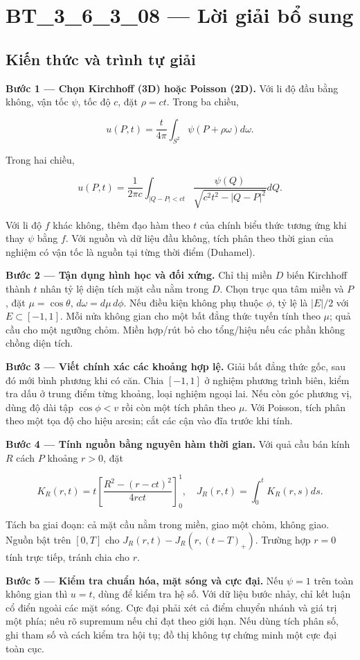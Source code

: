 \documentclass[10pt,a4paper]{article}
\begin{document}
\section*{BT\_3\_6\_3\_08 — Lời giải bổ sung}
\subsection*{Kiến thức và trình tự giải}
\textbf{Bước 1 — Chọn Kirchhoff (3D) hoặc Poisson (2D).} Với li độ đầu bằng không, vận tốc $\psi$, tốc độ $c$, đặt $\rho=ct$. Trong ba chiều,


\[
u(P,t)=\frac t{4\pi}\int_{S^2}\psi(P+\rho\omega)d\omega.
\]


Trong hai chiều,


\[
u(P,t)=\frac1{2\pi c}\int_{|Q-P|<ct}\frac{\psi(Q)}{\sqrt{c^2t^2-|Q-P|^2}}dQ.
\]


Với li độ $f$ khác không, thêm đạo hàm theo $t$ của chính biểu thức tương ứng khi thay $\psi$ bằng $f$. Với nguồn và dữ liệu đầu không, tích phân theo thời gian của nghiệm có vận tốc là nguồn tại từng thời điểm (Duhamel).

\textbf{Bước 2 — Tận dụng hình học và đối xứng.} Chỉ thị miền $D$ biến Kirchhoff thành $t$ nhân tỷ lệ diện tích mặt cầu nằm trong $D$. Chọn trục qua tâm miền và $P$, đặt $\mu=\cos\theta$, $d\omega=d\mu\,d\phi$. Nếu điều kiện không phụ thuộc $\phi$, tỷ lệ là $|E|/2$ với $E\subset[-1,1]$. Mỗi nửa không gian cho một bất đẳng thức tuyến tính theo $\mu$; quả cầu cho một ngưỡng chỏm. Miền hợp/rút bỏ cho tổng/hiệu nếu các phần không chồng diện tích.

\textbf{Bước 3 — Viết chính xác các khoảng hợp lệ.} Giải bất đẳng thức gốc, sau đó mới bình phương khi có căn. Chia $[-1,1]$ ở nghiệm phương trình biên, kiểm tra dấu ở trung điểm từng khoảng, loại nghiệm ngoại lai. Nếu còn góc phương vị, dùng độ dài tập $\cos\phi<v$ rồi còn một tích phân theo $\mu$. Với Poisson, tích phân theo một tọa độ cho hiệu arcsin; cắt các cận vào đĩa trước khi tính.

\textbf{Bước 4 — Tính nguồn bằng nguyên hàm thời gian.} Với quả cầu bán kính $R$ cách $P$ khoảng $r>0$, đặt


\[
K_R(r,t)=t\left[\frac{R^2-(r-ct)^2}{4rct}\right]_0^1,\quad J_R(r,t)=\int_0^tK_R(r,s)ds.
\]


Tách ba giai đoạn: cả mặt cầu nằm trong miền, giao một chỏm, không giao. Nguồn bật trên $[0,T]$ cho $J_R(r,t)-J_R(r,(t-T)_+)$. Trường hợp $r=0$ tính trực tiếp, tránh chia cho $r$.

\textbf{Bước 5 — Kiểm tra chuẩn hóa, mặt sóng và cực đại.} Nếu $\psi=1$ trên toàn không gian thì $u=t$, dùng để kiểm tra hệ số. Với dữ liệu bước nhảy, chỉ kết luận cổ điển ngoài các mặt sóng. Cực đại phải xét cả điểm chuyển nhánh và giá trị một phía; nêu rõ supremum nếu chỉ đạt theo giới hạn. Nếu dùng tích phân số, ghi tham số và cách kiểm tra hội tụ; đồ thị không tự chứng minh một cực đại toàn cục.
\end{document}

